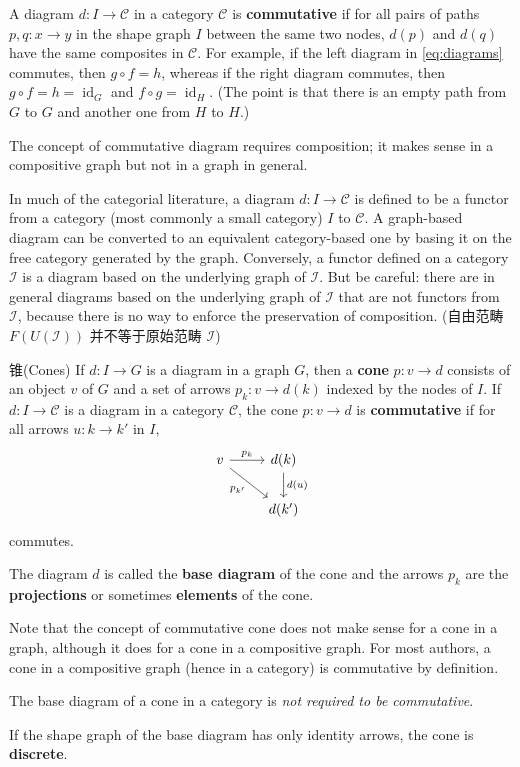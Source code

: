 \documentclass{beamer}
\begin{document}
\begin{frame}
A diagram $d\colon I \to \mathcal{C}$ in a category $\mathcal{C}$ is \textbf{commutative} if for all pairs of paths $p,q\colon x \to y$ in the shape graph $I$ between the same two nodes, $d(p)$ and $d(q)$ have the same composites in $\mathcal{C}$. For example, if the left diagram in \eqref{eq:diagrams} commutes, then $g\circ f = h$, whereas if the right diagram commutes, then $g\circ f = h = \operatorname{id}_G$ and $f\circ g = \operatorname{id}_H$. (The point is that there is an empty path from $G$ to $G$ and another one from $H$ to $H$.)

The concept of commutative diagram requires composition; it makes sense in a compositive graph but not in a graph in general.

In much of the categorial literature, a diagram $d\colon I \to \mathcal{C}$ is defined to be a functor from a category (most commonly a small category) $I$ to $\mathcal{C}$. A graph-based diagram can be converted to an equivalent category-based one by basing it on the free category generated by the graph. Conversely, a functor defined on a category $\mathcal{I}$ is a diagram based on the underlying graph of $\mathcal{I}$. But be careful: there are in general diagrams based on the underlying graph of $\mathcal{I}$ that are not functors from $\mathcal{I}$, because there is no way to enforce the preservation of composition. (自由范畴 $F(U(\mathcal{I}))$ 并不等于原始范畴 $\mathcal{I}$)
\end{frame}

\begin{frame}{锥(Cones)}
If $d\colon I \to G$ is a diagram in a graph $G$, then a \textbf{cone} $p\colon v \to d$ consists of an object $v$ of $G$ and a set of arrows $p_k\colon v \to d(k)$ indexed by the nodes of $I$. If $d\colon I \to \mathcal{C}$ is a diagram in a category $\mathcal{C}$, the cone $p\colon v \to d$ is \textbf{commutative} if for all arrows $u\colon k \to k'$ in $I$,
\[
\begin{tikzcd}
v \arrow[r, "p_k"] \arrow[dr, "p_{k'}"'] & d(k) \arrow[d, "d(u)"] \\
& d(k')
\end{tikzcd}
\]
commutes.

The diagram $d$ is called the \textbf{base diagram} of the cone and the arrows $p_k$ are the \textbf{projections} or sometimes \textbf{elements} of the cone.

Note that the concept of commutative cone does not make sense for a cone in a graph, although it does for a cone in a compositive graph. For most authors, a cone in a compositive graph (hence in a category) is commutative by definition.

The base diagram of a cone in a category is \emph{not required to be commutative}.

If the shape graph of the base diagram has only identity arrows, the cone is \textbf{discrete}.
\end{frame}
\end{document}
